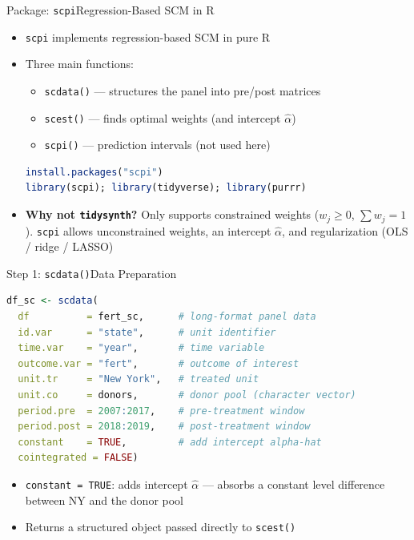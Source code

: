 \documentclass[hyperref={pdfpagelabels=false}]{beamer}
\begin{document}
\begin{frame}[fragile]{Package: \texttt{scpi}}{Regression-Based SCM in R}
\begin{itemize}
    \item \texttt{scpi} implements regression-based SCM in pure R
    \vspace{0.15cm}
    \item Three main functions:
    \begin{itemize}
        \item \texttt{scdata()} --- structures the panel into pre/post matrices
        \item \texttt{scest()} --- finds optimal weights (and intercept $\hat{\alpha}$)
        \item \texttt{scpi()} --- prediction intervals (not used here)
    \end{itemize}
    \vspace{0.15cm}
\begin{lstlisting}[language=R, style=r-style]
install.packages("scpi")
library(scpi); library(tidyverse); library(purrr)
\end{lstlisting}
    \vspace{0.15cm}
    \item \textbf{Why not \texttt{tidysynth}?} Only supports constrained weights
    ($w_j \geq 0$, $\sum w_j = 1$). \texttt{scpi} allows unconstrained weights,
    an intercept $\hat{\alpha}$, and regularization (OLS / ridge / LASSO)
\end{itemize}
\end{frame}


\begin{frame}[fragile]{Step 1: \texttt{scdata()}}{Data Preparation}
\begin{lstlisting}[language=R, style=r-style]
df_sc <- scdata(
  df          = fert_sc,      # long-format panel data
  id.var      = "state",      # unit identifier
  time.var    = "year",       # time variable
  outcome.var = "fert",       # outcome of interest
  unit.tr     = "New York",   # treated unit
  unit.co     = donors,       # donor pool (character vector)
  period.pre  = 2007:2017,    # pre-treatment window
  period.post = 2018:2019,    # post-treatment window
  constant    = TRUE,         # add intercept alpha-hat
  cointegrated = FALSE)
\end{lstlisting}
\begin{itemize}
    \vspace{0.15cm}
    \item \texttt{constant = TRUE}: adds intercept $\hat{\alpha}$ --- absorbs a
    constant level difference between NY and the donor pool
    \vspace{0.1cm}
    \item Returns a structured object passed directly to \texttt{scest()}
\end{itemize}
\end{frame}
\end{document}
